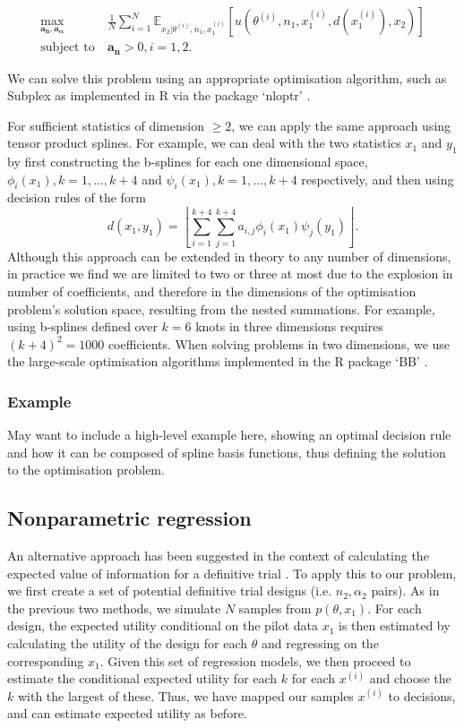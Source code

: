 \documentclass[sagev, Crown]{sagej} %
\begin{document}
\begin{align}\label{eqn:opt}
\max_{\mathbf{a_n}, \mathbf{a_{\alpha}}} ~ & \frac{1}{N} \sum_{i=1}^{N} \mathbb{E}_{x_2 | \theta^{(i)}, n_1, x_1^{(i)}}[ u(\theta^{(i)}, n_1, x_1^{(i)}, d(x_1^{(i)}), x_2) ] \\
\text{subject to} ~ & \mathbf{a_n} > 0, i=1,2. \nonumber
\end{align}


We can solve this problem using an appropriate optimisation algorithm, such as Subplex \cite{Rowan1990} as implemented in R via the package `nloptr' \cite{Ypma2018}.

For sufficient statistics of dimension $\geq 2$, we can apply the same approach using tensor product splines. For example, we can deal with the two statistics $x_1$ and $y_1$ by first constructing the b-splines for each one dimensional space, $\phi_i(x_1), k=1,\ldots,k+4$ and $\psi_i(x_1), k=1,\ldots,k+4$ respectively, and then using decision rules of the form 
$$
d(x_1, y_1) = \left\lfloor \sum_{i=1}^{k+4} \sum_{j=1}^{k+4} a_{i,j} \phi_i(x_1) \psi_j(y_1) \right\rfloor.
$$
Although this approach can be extended in theory to any number of dimensions, in practice we find we are limited to two or three at most due to the explosion in number of coefficients, and therefore in the dimensions of the optimisation problem's solution space, resulting from the nested summations. For example, using b-splines defined over $k = 6$ knots in three dimensions requires $(k+4)^2 = 1000$ coefficients. When solving problems in two dimensions, we use the large-scale optimisation algorithms implemented in the R package `BB' \cite{Varadhan2009}.

\subsubsection{Example}

May want to include a high-level example here, showing an optimal decision rule and how it can be composed of spline basis functions, thus defining the solution to the optimisation problem.

\subsection{Nonparametric regression}

An alternative approach has been suggested in the context of calculating the expected value of information for a definitive trial \cite{Strong2015}. To apply this to our problem, we first create a set of potential definitive trial designs (i.e. $n_2, \alpha_2$ pairs). As in the previous two methods, we simulate $N$ samples from $p(\theta, x_1)$. For each design, the expected utility conditional on the pilot data $x_1$ is then estimated by calculating the utility of the design for each $\theta$ and regressing on the corresponding $x_1$. Given this set of regression models, we then proceed to estimate the conditional expected utility for each $k$ for each $x^{(i)}$ and choose the $k$ with the largest of these. Thus, we have mapped our samples $x^{(i)}$ to decisions, and can estimate expected utility as before. 
\end{document}
